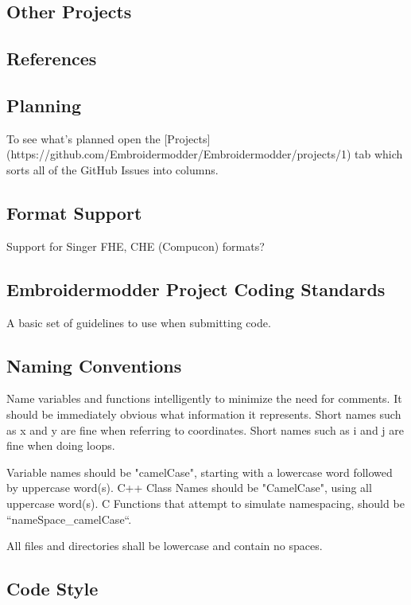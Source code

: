 \documentclass[a4paper]{report}
\begin{document}
\subsection{Other Projects}

\subsection{References}

\subsection{Planning}

To see what's planned open the
[Projects](https://github.com/Embroidermodder/Embroidermodder/projects/1)
tab which sorts all of the GitHub Issues into columns.

\subsection{Format Support}

Support for Singer FHE, CHE (Compucon) formats?

\subsection{Embroidermodder Project Coding Standards}

A basic set of guidelines to use when submitting code.

\subsection{Naming Conventions}

Name variables and functions intelligently to minimize the need for
comments. It should be immediately obvious what information it
represents. Short names such as x and y are fine when referring to
coordinates. Short names such as i and j are fine when doing loops.

Variable names should be "camelCase", starting with a lowercase word
followed by uppercase word(s). C++ Class Names should be "CamelCase",
using all uppercase word(s). C Functions that attempt to simulate namespacing,
should be ``nameSpace\_camelCase``.

All files and directories shall be lowercase and contain no spaces.

\subsection{Code Style}
\end{document}
